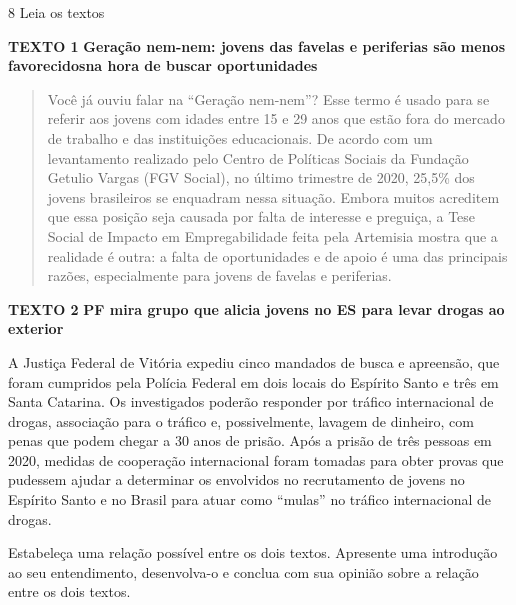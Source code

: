 \num{8} Leia os textos

\textbf{TEXTO 1}
\textbf{Geração nem-nem: jovens das favelas e periferias são menos favorecidosna hora de buscar oportunidades}

\begin{quote}
Você já ouviu falar na ``Geração nem-nem''? Esse termo é usado para se
referir aos jovens com idades entre 15 e 29 anos que estão fora do
mercado de trabalho e das instituições educacionais. De acordo com um
levantamento realizado pelo Centro de Políticas Sociais da Fundação
Getulio Vargas (FGV Social), no último trimestre de 2020, 25,5\% dos
jovens brasileiros se enquadram nessa situação. Embora muitos acreditem
que essa posição seja causada por falta de interesse e preguiça, a Tese
Social de Impacto em Empregabilidade feita pela Artemisia mostra que a
realidade é outra: a falta de oportunidades e de apoio é uma das
principais razões, especialmente para jovens de favelas e periferias.
\end{quote}


\textbf{TEXTO 2}
\textbf{PF mira grupo que alicia jovens no ES para levar drogas ao exterior}

A Justiça Federal de Vitória expediu cinco mandados de busca e
apreensão, que foram cumpridos pela Polícia Federal em dois locais do
Espírito Santo e três em Santa Catarina. Os investigados poderão
responder por tráfico internacional de drogas, associação para o tráfico
e, possivelmente, lavagem de dinheiro, com penas que podem chegar a 30
anos de prisão. Após a prisão de três pessoas em 2020, medidas de
cooperação internacional foram tomadas para obter provas que pudessem
ajudar a determinar os envolvidos no recrutamento de jovens no Espírito
Santo e no Brasil para atuar como ``mulas'' no tráfico internacional de
drogas.


Estabeleça uma relação possível entre os dois textos. Apresente uma
introdução ao seu entendimento, desenvolva-o e conclua com sua opinião
sobre a relação entre os dois textos.

